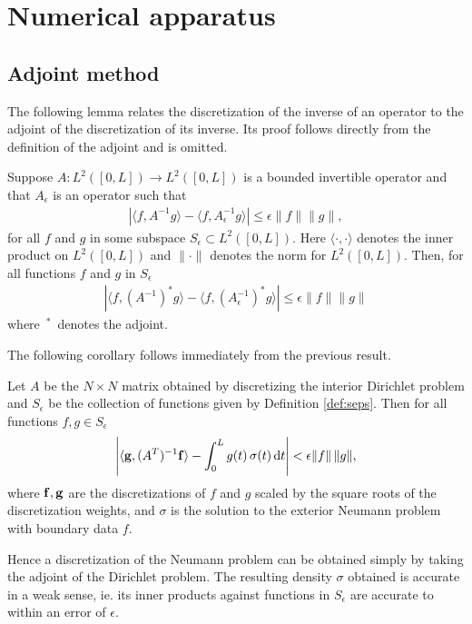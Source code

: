 
\section{Numerical apparatus \label{sec:napp}}
\subsection{Adjoint method}

The following lemma relates the discretization of the inverse of an operator to the adjoint of the discretization of its inverse. Its proof follows directly from the definition of the adjoint and is omitted.
\begin{lemma}\label{lem_adjm}
Suppose $A: L^2([0,L]) \to L^2([0,L])$ is a bounded invertible operator and that $A_\epsilon$ is an operator such that
\begin{align}
\left| \langle f,A^{-1} g \rangle - \langle f,A^{-1}_\epsilon g \rangle \right| \le \epsilon \|f\| \|g\|,
\end{align}
for all $f$ and $g$ in some subspace $S_{\epsilon} \subset L^2([0,L]).$ Here $\langle \cdot, \cdot \rangle$ denotes the inner product on $L^2([0,L])$ and $\| \cdot\|$ denotes the norm for $L^2([0,L]).$ Then, for all functions $f$ and $g$ in $S_{\epsilon}$
\begin{align}
\left| \langle f,(A^{-1})^* g \rangle - \langle f,\left(A^{-1}_\epsilon\right)^* g \rangle \right| \le \epsilon \|f\| \|g\|
\end{align}
where $\,{{}^*}\,$ denotes the adjoint.
\end{lemma}

The following corollary follows immediately from the previous result.
\begin{corollary}
Let $A$ be the $N\times N$ matrix obtained by discretizing the interior Dirichlet problem and $S_\epsilon$ be the collection of functions given by Definition \ref{def:seps}. Then for all functions $f,g \in S_\epsilon$
\begin{align}
\left| \langle {\bf g}, (A^T)^{-1}{\bf f} \rangle - \int_0^L g(t)\,\sigma(t)\,{\rm d}t \right| < \epsilon \|f\|\, \|g\|,
\end{align}
where ${\bf f},{\bf g}$ are the discretizations of $f$ and $g$ scaled by the square roots of the discretization weights, and $\sigma$ is the solution to the exterior Neumann problem with boundary data $f$.
\end{corollary}

Hence a discretization of the Neumann problem can be obtained simply by taking the adjoint of the Dirichlet problem. The resulting density $\sigma$ obtained is accurate in a weak sense, ie. its inner products against functions in $S_\epsilon$ are accurate to within an error of $\epsilon.$

